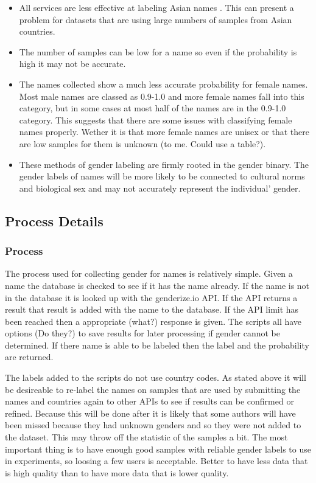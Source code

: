 \documentclass{article}
\begin{document}
\begin{itemize}
    \item All services are less effective at labeling Asian names \cite{Santamaria2018}. This can present a problem for datasets that are using large numbers of samples from Asian countries.

    \item The number of samples can be low for a name so even if the probability is high it may not be accurate.

    \item The names collected show a much less accurate probability for female names. Most male names are classed as 0.9-1.0 and more female names fall into this category, but in some cases at most half of the names are in the 0.9-1.0 category. This suggests that there are some issues with classifying female names properly. Wether it is that more female names are unisex or that there are low samples for them is unknown (to me. Could use a table?).
    
    \item These methods of gender labeling are firmly rooted in the gender binary. The gender labels of names will be more likely to be connected to cultural norms and biological sex and may not accurately represent the individual' gender.
\end{itemize}


\subsection{Process Details}
\subsubsection*{Process}
The process used for collecting gender for names is relatively simple. Given a name the database is checked to see if it has the name already. If the name is not in the database it is looked up with the genderize.io API. If the API returns a result that result is added with the name to the database. If the API limit has been reached then a appropriate (what?) response is given. The scripts all have options (Do they?) to save results for later processing if gender cannot be determined. If there name is able to be labeled then the label and the probability are returned.

The labels added to the scripts do not use country codes. As stated above it will be desireable to re-label the names on samples that are used by submitting the names and countries again to other APIs to see if results can be confirmed or refined. Because this will be done after it is likely that some authors will have been missed because they had unknown genders and so they were not added to the dataset. This may throw off the statistic of the samples a bit. The most important thing is to have enough good samples with reliable gender labels to use in experiments, so loosing a few users is acceptable. Better to have less data that is high quality than to have more data that is lower quality.
\end{document}
